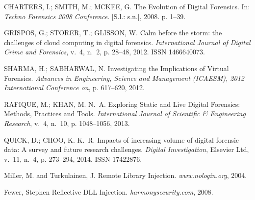 \documentclass[conference]{IEEEtran}
\begin{document}
\begin{thebibliography}{1}
{CHARTERS, I.; SMITH, M.; MCKEE, G. {The Evolution of Digital Forensics}. In:
  \emph{Techno Forensics 2008 Conference}. [S.l.: s.n.], 2008. p. 1--39.}

{GRISPOS, G.; STORER, T.; GLISSON, W. {Calm before the storm: the challenges of
  cloud computing in digital forensics}.
\emph{International Journal of Digital Crime and Forensics}, v.~4, n.~2, p.
  28--48, 2012.
ISSN 1466640073.}

{SHARMA, H.; SABHARWAL, N. {Investigating the Implications of Virtual
  Forensics}.
\emph{Advances in Engineering, Science and Management (ICAESM), 2012
  International Conference on}, p. 617--620, 2012.}
  
{RAFIQUE, M.; KHAN, M. N.~A. {Exploring Static and Live Digital Forensics:
  Methods, Practices and Tools}.
\emph{International Journal of Scientific {\&} Engineering Research}, v.~4,
  n.~10, p. 1048--1056, 2013.}
  
{QUICK, D.; CHOO, K. K.~R. {Impacts of increasing volume of digital forensic
  data: A survey and future research challenges}.
\emph{Digital Investigation}, Elsevier Ltd, v.~11, n.~4, p. 273--294, 2014.
ISSN 17422876.}

{Miller, M. and Turkulainen, J. {Remote Library Injection}.
\emph{www.nologin.org}, 2004. }

{Fewer, Stephen {Reflective DLL Injection}.
\emph{harmonysecurity.com}, 2008. }

\end{thebibliography}

\end{document}

